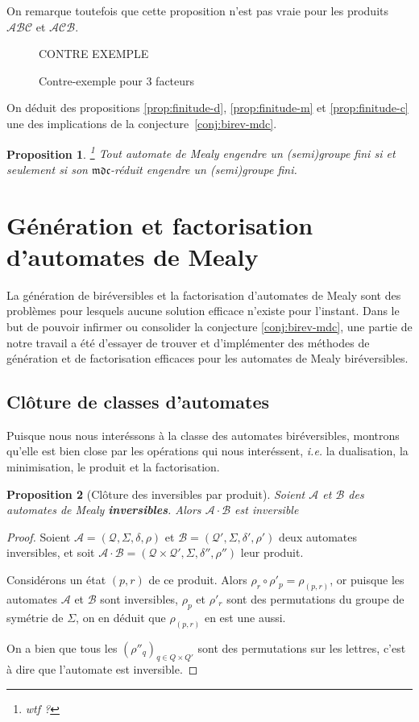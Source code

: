 \documentclass[11pt,a4paper]{article}
\newtheorem{prop}{Proposition}
\begin{document}
On remarque toutefois que cette proposition n'est pas vraie pour les produits $\mathcal{ABC}$ et $\mathcal{ACB}$.

\begin{figure}[h!]
  CONTRE EXEMPLE
  \caption{Contre-exemple pour 3 facteurs}
\end{figure}

On déduit des propositions \ref{prop:finitude-d}, \ref{prop:finitude-m} et \ref{prop:finitude-c} une des implications de la conjecture~\ref{conj:birev-mdc}.

\begin{prop}\footnote{wtf ?}
  Tout automate de Mealy engendre un (semi)groupe fini si et seulement si son $\mathfrak{mdc}$-réduit engendre un (semi)groupe fini.
\end{prop}

\section{Génération et factorisation d'automates de Mealy}
La génération de biréversibles et la factorisation d'automates de Mealy sont des problèmes pour lesquels aucune solution efficace n'existe pour l'instant. Dans le but de pouvoir infirmer ou consolider la conjecture \ref{conj:birev-mdc}, une partie de notre travail a été d'essayer de trouver et d'implémenter des méthodes de génération et de factorisation efficaces pour les automates de Mealy biréversibles.


\subsection{Clôture de classes d'automates\label{sec:cloture}}

Puisque nous nous interéssons à la classe des automates biréversibles, montrons qu'elle est bien close par les opérations qui nous interéssent, \emph{i.e.} la dualisation, la minimisation, le produit et la factorisation.

\begin{prop}[Clôture des inversibles par produit]
  Soient $\mathcal{A}$ et $\mathcal{B}$ des automates de Mealy \textbf{inversibles}. Alors $\mathcal{A}\cdot\mathcal{B}$ est inversible
\end{prop}

\begin{proof}
  Soient $\mathcal{A}=\left(\mathcal{Q}, \Sigma, \delta, \rho\right)$ et $\mathcal{B}=\left(\mathcal{Q'}, \Sigma, \delta', \rho'\right)$ deux automates inversibles, et soit $\mathcal{A\cdot B}=\left(\mathcal{Q\times Q'}, \Sigma, \delta'', \rho''\right)$ leur produit.


  Considérons un état $(p, r)$ de ce produit. Alors $\rho_r\circ\rho'_p=\rho_{(p,r)}$, or puisque les automates $\mathcal{A}$ et $\mathcal{B}$ sont inversibles, $\rho_p$ et $\rho'_r$ sont des permutations du groupe de symétrie de $\Sigma$, on en déduit que $\rho_{(p, r)}$ en est une aussi.

  On a bien que tous les ${(\rho''_q)}_{q\in Q\times Q'}$ sont des permutations sur les lettres, c'est à dire que l'automate est inversible.
\end{proof}
\end{document}
